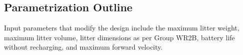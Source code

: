 \subsection{Parametrization Outline}

Input parameters that modify the design include the maximum litter weight, maximum litter volume, litter dimensions as per Group WR2B, battery life without recharging, and maximum forward velocity.
